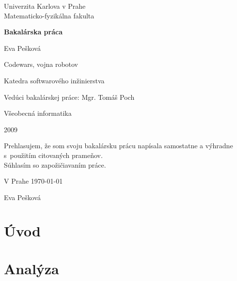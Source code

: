 \documentclass[12pt,a4paper,notitlepage]{report}
\begin{document}
\begin{titlepage}
\begin{center}
\vspace{1.5in}
{\rm Univerzita Karlova v Prahe\\
    Matematicko-fyzikálna fakulta}
\par
\vspace{0.7in}
{\huge \bf Bakalárska práca}
\par
\vspace{0.5in}
{Eva Pešková}
\par
\vspace{0.5in}
Codewars, vojna robotov
\par
\vfill
Katedra softwarového inžinierstva
\par
\vspace{0.5in}
Vedúci bakalárskej práce: Mgr. Tomáš Poch
\par
\vspace{0.5in}
Všeobecná informatika
\par
\vspace{0.5in}
2009
\end{center}
\end{titlepage}
\vfill
Prehlasujem, že som svoju bakalársku prácu napísala samostatne a výhradne s~použitím citovaných prameňov.\\
Súhlasím so zapožičiavaním práce.\\
\par
V Prahe \today
\begin{flushright}
Eva Pešková
\end{flushright}

\newtheorem{definicia}{Značenie}

\tableofcontents
\chapter{Úvod}%

\chapter{Analýza}
%


\end{document}
